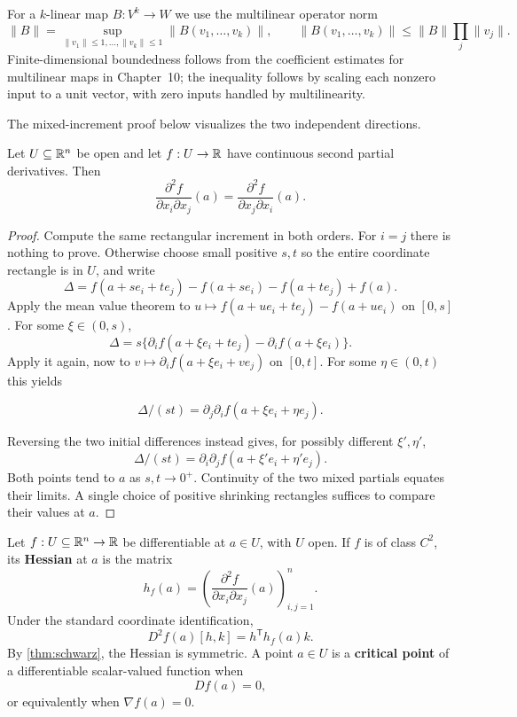 For a $k$-linear map $B:V^k\to W$ we use the multilinear operator norm
\[
\|B\|=\sup_{\|v_1\|\leq1,\ldots,\|v_k\|\leq1}\|B(v_1,\ldots,v_k)\|,
\qquad \|B(v_1,\ldots,v_k)\|\leq\|B\|\prod_j\|v_j\|.
\]
Finite-dimensional boundedness follows from the coefficient estimates for
multilinear maps in Chapter~10; the inequality follows by scaling each
nonzero input to a unit vector, with zero inputs handled by multilinearity.

The mixed-increment proof below visualizes the two independent directions.
\begin{center}
\end{center}
\begin{theorem}
\label{thm:schwarz}
Let $U\subseteq\mathbb{R}^n$ be open and let $f:U\to\mathbb{R}$ have continuous second
partial derivatives.  Then
\[
\frac{\partial^2f}{\partial x_i\partial x_j}(a)
=
\frac{\partial^2f}{\partial x_j\partial x_i}(a).
\]
\end{theorem}
\begin{proof}
Compute the same rectangular increment in both orders.
For $i=j$ there is nothing to prove. Otherwise choose small positive
$s,t$ so the entire coordinate rectangle is in $U$, and write
\[
\Delta=f(a+se_i+te_j)-f(a+se_i)-f(a+te_j)+f(a).
\]
Apply the mean value theorem to
$u\mapsto f(a+ue_i+te_j)-f(a+ue_i)$ on $[0,s]$. For some
$\xi\in(0,s)$,
\[
\Delta=s\{\partial_i f(a+\xi e_i+te_j)-\partial_i f(a+\xi e_i)\}.
\]
Apply it again, now to $v\mapsto\partial_i f(a+\xi e_i+ve_j)$
on $[0,t]$. For some $\eta\in(0,t)$ this yields

\[
\Delta/(st)=\partial_j\partial_i f(a+\xi e_i+\eta e_j).
\]

Reversing the two initial differences instead gives, for possibly different
$\xi',\eta'$,
\[
\Delta/(st)=\partial_i\partial_j
f(a+\xi'e_i+\eta'e_j).
\]
 Both points tend to $a$ as $s,t\to0^+$.
Continuity of the two mixed partials equates their limits. A single
choice of positive shrinking rectangles suffices to compare their values at $a$.
\end{proof}

\begin{definition}
Let $f:U\subseteq\mathbb{R}^n\to\mathbb{R}$ be differentiable at $a\in U$, with $U$ open.
If $f$ is of class $C^2$, its \textbf{Hessian} at $a$ is the matrix
\[
h_f(a)=
\left(\frac{\partial^2f}{\partial x_i\partial x_j}(a)\right)_{i,j=1}^n.
\]
Under the standard coordinate identification,
\[
D^2f(a)[h,k]=h^{\mathsf T}h_f(a)k.
\]
By \cref{thm:schwarz}, the Hessian is symmetric.  A point $a\in U$ is a
\textbf{critical point} of a differentiable scalar-valued function when
\[
Df(a)=0,
\]
or equivalently when $\nabla f(a)=0$.
\end{definition}

